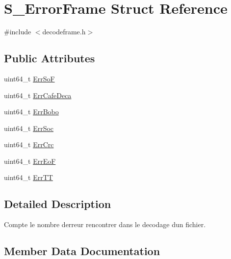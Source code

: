 \hypertarget{structS__ErrorFrame}{}\section{S\+\_\+\+Error\+Frame Struct Reference}
\label{structS__ErrorFrame}


{\ttfamily \#include $<$decodeframe.\+h$>$}

\subsection*{Public Attributes}
\begin{DoxyCompactItemize}
\item 
uint64\+\_\+t \hyperlink{structS__ErrorFrame_afd3ab1e3e1a636c55f90b4aa13fa0629}{Err\+SoF}
\item 
uint64\+\_\+t \hyperlink{structS__ErrorFrame_afd8c552c6ca758eb5aedb35a4a7ae611}{Err\+Cafe\+Deca}
\item 
uint64\+\_\+t \hyperlink{structS__ErrorFrame_a7340625c1dbd480af74d8af9a368430b}{Err\+Bobo}
\item 
uint64\+\_\+t \hyperlink{structS__ErrorFrame_a35a6a18bbb7900d93a401c9ddbceb5c1}{Err\+Soc}
\item 
uint64\+\_\+t \hyperlink{structS__ErrorFrame_a7b70f13f1ca7e67689d74352af21b69d}{Err\+Crc}
\item 
uint64\+\_\+t \hyperlink{structS__ErrorFrame_a684de2c10638fec6d7d1895c4bb50f2a}{Err\+EoF}
\item 
uint64\+\_\+t \hyperlink{structS__ErrorFrame_a2f37aa2839ebd8571f577130f96a8005}{Err\+TT}
\end{DoxyCompactItemize}


\subsection{Detailed Description}
Compte le nombre d\textquotesingle{}erreur rencontrer dans le decodage d\textquotesingle{}un fichier. 

\subsection{Member Data Documentation}
\mbox{\label{structS__ErrorFrame_a7340625c1dbd480af74d8af9a368430b}} 
